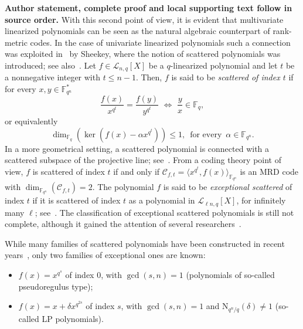 \documentclass[11pt]{article}
\theoremstyle{definition}
\numberwithin{equation}{section}
\begin{document}
\noindent\textbf{Author statement, complete proof and local supporting text follow in source order.}
With this second point of view, it is evident that multivariate linearized polynomials can be seen as the natural algebraic counterpart of rank-metric codes. In the case of univariate linearized polynomials such a connection was exploited in~\cite{sheekey2016new} by Sheekey, where the notion of scattered polynomials was introduced; see also~\cite{bartoli2018exceptional}. Let $f \in \mathcal{L}_{n,q}[X]$ be a $q$-linearized polynomial and let $t$ be a nonnegative integer with $t\leq n-1$. Then, $f$ is said to be \emph{scattered of index $t$} if for every $x,y \in \mathbb{F}_{q^n}^*$
\[ \frac{f(x)}{x^{q^t}}=\frac{f(y)}{y^{q^t}}\,\, \Longleftrightarrow\,\, \frac{y}x\in \mathbb{F}_q, \]
or equivalently
\begin{equation*} \dim_{\mathbb{F}_q}(\ker(f(x)-\alpha x^{q^t}))\leq 1, \,\,\,\text{for every}\,\,\, \alpha \in \mathbb{F}_{q^n}. \end{equation*}
In a more geometrical setting, a scattered polynomial is connected with a scattered subspace of the projective line; see~\cite{blokhuis2000scattered}. From a coding theory point of view,  $f$ is scattered of index $t$ if and only if $\mathcal{C}_{f,t}=\langle x^{q^t}, f(x) \rangle_{\mathbb{F}_{q^n}}$ is an MRD code with $\dim_{\mathbb{F}_{q^n}}(\mathcal{C}_{f,t})=2$.
The polynomial $f$ is said to be \emph{exceptional scattered} of index $t$ if it is scattered of index $t$ as a polynomial in $\mathcal{L}_{\ell n,q}[X]$, for infinitely many $\ell$; see~\cite{bartoli2018exceptional}. The classification of exceptional scattered polynomials is still not complete, although it gained the attention of several researchers~\cite{Bartoli:2020aa4,bartoli2018exceptional,MR4190573,MR4163074,bartoli2022towards}.

While many families of scattered polynomials have been constructed in recent years~\cite{sheekey2016new,lunardon2018generalized,lunardon2000blocking,zanella2019condition,MR4173668,longobardi2021linear,longobardi2023large,NPZ,zanella2020vertex,csajbok2018new,csajbok2018new2,marino2020mrd,blokhuis2000scattered}, only two families of exceptional ones are known:
\begin{itemize}
    \item[(Ps)] $f(x)=x^{q^s}$ of index $0$, with $\gcd(s,n)=1$ (polynomials of so-called pseudoregulus type);
    \item[(LP)] $f(x)=x+\delta x^{q^{2s}}$ of index $s$, with $\gcd(s,n)=1$ and $\mathrm{N}_{q^n/q}(\delta)\ne1$ (so-called LP polynomials).
\end{itemize}
\end{document}
